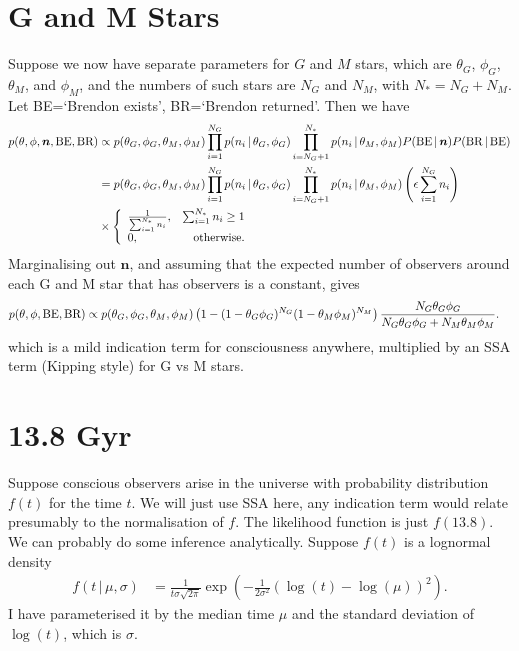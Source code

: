 \documentclass[a4paper, 12pt]{article}
\newcommand{\given}{\,|\,}
\begin{document}
\section{G and M Stars}
Suppose we now have separate parameters for $G$ and $M$ stars,
which are $\theta_G$, $\phi_G$, $\theta_M$, and $\phi_M$, and the numbers of
such stars are $N_G$ and $N_M$, with $N_* = N_G + N_M$.
Let BE=`Brendon exists', BR=`Brendon returned'.
Then we have
\begin{align}
p(\theta, \phi, \boldsymbol{n}, \textnormal{BE},
  \textnormal{BR}) &\propto
    p(\theta_G, \phi_G, \theta_M, \phi_M)
    \prod_{i=1}^{N_G} p(n_i \given \theta_G, \phi_G)
    \prod_{i=N_G+1}^{N_*} p(n_i \given \theta_M, \phi_M)
        P(\textnormal{BE} \given \boldsymbol{n})
                P(\textnormal{BR} \given \textnormal{BE})\\
    &=     p(\theta_G, \phi_G, \theta_M, \phi_M)
    \prod_{i=1}^{N_G} p(n_i \given \theta_G, \phi_G)
    \prod_{i=N_G+1}^{N_*} p(n_i \given \theta_M, \phi_M)
        \left(\epsilon\sum_{i=1}^{N_G}n_i\right) \\
    &\times
        \left\{
        \begin{array}{lr}
        \frac{1}{\sum_{i=1}^{N_*} n_i}, &\sum_{i=1}^{N_*} n_i \geq 1 \\
        0, &\textnormal{otherwise}.
        \end{array}
        \right.
\end{align}
Marginalising out $\boldsymbol{n}$, and assuming that the expected
number of observers around each G and M star that has observers
is a constant, gives
\begin{align}
p(\theta, \phi, \textnormal{BE},
  \textnormal{BR}) &\propto
    p(\theta_G, \phi_G, \theta_M, \phi_M)
    \left(1 - (1-\theta_G\phi_G)^{N_G}(1 - \theta_M\phi_M)^{N_M}\right)
    \frac{N_G\theta_G\phi_G}{N_G\theta_G\phi_G + N_M\theta_M\phi_M}.
\end{align}
which is a mild indication term for consciousness anywhere, multiplied
by an SSA term (Kipping style) for G vs M stars.


\section{13.8 Gyr}
Suppose conscious observers arise in the universe with probability distribution
$f(t)$ for the time $t$. We will just use SSA here, any indication term would
relate presumably to the normalisation of $f$.
The likelihood function is just $f(13.8)$. We can probably do some inference
analytically. Suppose $f(t)$ is a lognormal density
\begin{align}
f(t \given \mu, \sigma) &= \frac{1}{t\sigma\sqrt{2\pi}}
    \exp\left(-\frac{1}{2\sigma^2}\left(\log(t) - \log(\mu)\right)^2\right).
\end{align}
I have parameterised it by the median time $\mu$ and the standard deviation
of $\log(t)$, which is $\sigma$.
\end{document}
